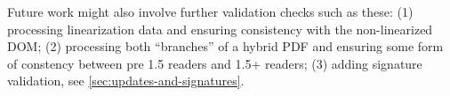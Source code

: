 Future work might also involve further validation checks such as these:
(1) processing linearization data and ensuring consistency with the
non-linearized DOM;
(2) processing both ``branches'' of a hybrid PDF and ensuring
some form of constency between pre 1.5 readers and 1.5+ readers;
(3) adding signature validation, see \cref{sec:updates-and-signatures}.

\iffalse
\begin{code}
trailersConsistentAcrossUpdates :: [Update] -> Bool
trailersConsistentAcrossUpdates = stub

\end{code}
\fi
